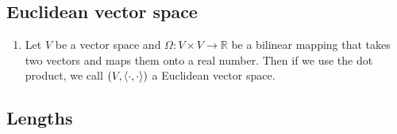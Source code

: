 \subsection{Euclidean vector space}

\begin{enumerate}
    \item Let $V$ be a vector space and $\Omega : V \times V \to \mathbb{R}$ be a bilinear mapping that takes two vectors and maps them onto a real number. Then if we use the dot product, we call $(V,\langle\cdot, \cdot\rangle)$ a Euclidean vector space.
\end{enumerate}



\subsection{Lengths}

